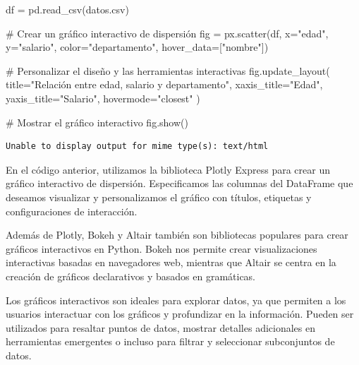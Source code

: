 \documentclass[
  a4paper,
]{article}
\newenvironment{Shaded}{}{}
\newcommand{\CommentTok}[1]{\textcolor[rgb]{0.42,0.45,0.49}{#1}}
\newcommand{\NormalTok}[1]{\textcolor[rgb]{0.14,0.16,0.18}{#1}}
\newcommand{\OperatorTok}[1]{\textcolor[rgb]{0.14,0.16,0.18}{#1}}
\newcommand{\StringTok}[1]{\textcolor[rgb]{0.01,0.18,0.38}{#1}}
\begin{document}
\begin{Shaded}
\begin{Highlighting}[]
\NormalTok{df }\OperatorTok{=}\NormalTok{ pd.read\_csv(}\StringTok{\textquotesingle{}datos.csv\textquotesingle{}}\NormalTok{)}

\CommentTok{\# Crear un gráfico interactivo de dispersión}
\NormalTok{fig }\OperatorTok{=}\NormalTok{ px.scatter(df, x}\OperatorTok{=}\StringTok{"edad"}\NormalTok{, y}\OperatorTok{=}\StringTok{"salario"}\NormalTok{,}
\NormalTok{                 color}\OperatorTok{=}\StringTok{"departamento"}\NormalTok{, hover\_data}\OperatorTok{=}\NormalTok{[}\StringTok{"nombre"}\NormalTok{])}

\CommentTok{\# Personalizar el diseño y las herramientas interactivas}
\NormalTok{fig.update\_layout(}
\NormalTok{    title}\OperatorTok{=}\StringTok{"Relación entre edad, salario y departamento"}\NormalTok{,}
\NormalTok{    xaxis\_title}\OperatorTok{=}\StringTok{"Edad"}\NormalTok{,}
\NormalTok{    yaxis\_title}\OperatorTok{=}\StringTok{"Salario"}\NormalTok{,}
\NormalTok{    hovermode}\OperatorTok{=}\StringTok{"closest"}
\NormalTok{)}

\CommentTok{\# Mostrar el gráfico interactivo}
\NormalTok{fig.show()}
\end{Highlighting}
\end{Shaded}

\begin{verbatim}
Unable to display output for mime type(s): text/html
\end{verbatim}

En el código anterior, utilizamos la biblioteca Plotly Express para
crear un gráfico interactivo de dispersión. Especificamos las columnas
del DataFrame que deseamos visualizar y personalizamos el gráfico con
títulos, etiquetas y configuraciones de interacción.

Además de Plotly, Bokeh y Altair también son bibliotecas populares para
crear gráficos interactivos en Python. Bokeh nos permite crear
visualizaciones interactivas basadas en navegadores web, mientras que
Altair se centra en la creación de gráficos declarativos y basados en
gramáticas.

Los gráficos interactivos son ideales para explorar datos, ya que
permiten a los usuarios interactuar con los gráficos y profundizar en la
información. Pueden ser utilizados para resaltar puntos de datos,
mostrar detalles adicionales en herramientas emergentes o incluso para
filtrar y seleccionar subconjuntos de datos.
\end{document}
